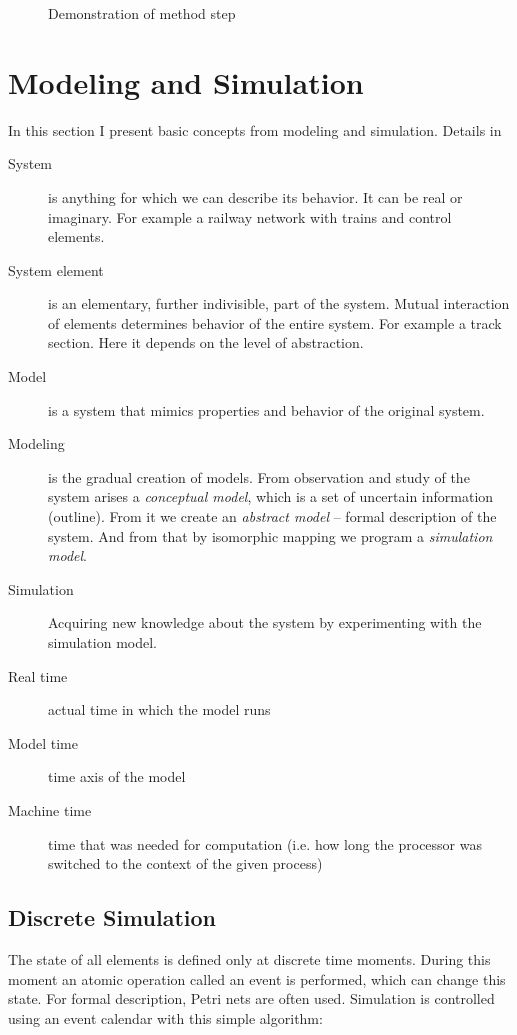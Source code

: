 \documentclass[english]{cls/fitthesis}
\newcommand{\insertplot}[2]{
  \begin{figure}[hbtp]
    \begin{center}
      
      \caption{#2}
      \label{#1}
    \end{center}
  \end{figure}
}
\begin{document}
      \insertplot{rkf45}{Demonstration of method step}

  \section{Modeling and Simulation}\label{modelling}
    In this section I present basic concepts from modeling and simulation.
    Details in \cite{imsSkripta, helsgaun2001}
    \begin{description}
      \item[System] is anything for which we can describe its behavior. It can be real or imaginary. For example
 	a railway network with trains and control elements.
      \item[System element] is an elementary, further indivisible, part of the system. Mutual interaction of elements determines behavior
        of the entire system. For example a track section. Here it depends on the level of abstraction.
      \item[Model] is a system that mimics properties and behavior of the original system.
      \item[Modeling] is the gradual creation of models. From observation and study of the system arises
      a \emph{conceptual model}, which is a set of uncertain information (outline).
      From it we create an \emph{abstract model} -- formal description of the system.
      And from that by isomorphic mapping we program a \emph{simulation model}.
      \item[Simulation] Acquiring new knowledge about the system by experimenting with the simulation model.
      \item[Real time] actual time in which the model runs
      \item[Model time] time axis of the model
      \item[Machine time] time that was needed for computation (i.e. how long the processor was switched to the context
       of the given process)
    \end{description}

    \subsection{Discrete Simulation}
      The state of all elements is defined only at discrete time moments.
      During this moment an atomic operation called an event is performed, which can change this state.
      For formal description, Petri nets are often used. Simulation is controlled using an event calendar
      with this simple algorithm:
\end{document}
